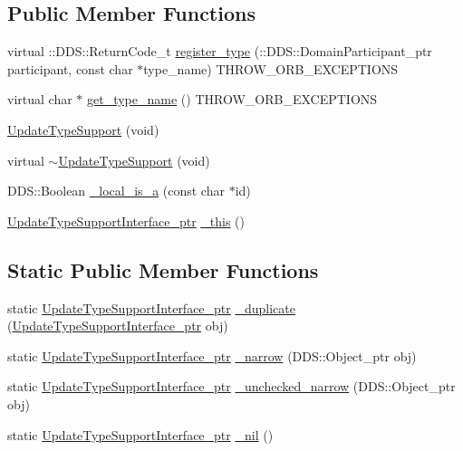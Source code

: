 \subsection*{Public Member Functions}
\begin{DoxyCompactItemize}
\item 
virtual ::DDS::ReturnCode\_\-t \hyperlink{classKnowledge_1_1UpdateTypeSupport_a1ebc851d4abdb5c52bb31a66ab1e73da}{register\_\-type} (::DDS::DomainParticipant\_\-ptr participant, const char $\ast$type\_\-name) THROW\_\-ORB\_\-EXCEPTIONS
\item 
virtual char $\ast$ \hyperlink{classKnowledge_1_1UpdateTypeSupport_a319f35c54cdd9aba6622c842b42b9ece}{get\_\-type\_\-name} () THROW\_\-ORB\_\-EXCEPTIONS
\item 
\hyperlink{classKnowledge_1_1UpdateTypeSupport_a18f5d8f5d5d9a4db5b78ad2449550f5e}{UpdateTypeSupport} (void)
\item 
virtual \hyperlink{classKnowledge_1_1UpdateTypeSupport_a2797f963a7aab3c29255166f3aca580f}{$\sim$UpdateTypeSupport} (void)
\item 
DDS::Boolean \hyperlink{classKnowledge_1_1UpdateTypeSupportInterface_a1c30da427241d245b73d9f6d494a741f}{\_\-local\_\-is\_\-a} (const char $\ast$id)
\item 
\hyperlink{classKnowledge_1_1UpdateTypeSupportInterface}{UpdateTypeSupportInterface\_\-ptr} \hyperlink{classKnowledge_1_1UpdateTypeSupportInterface_ac4f8121e712162f36c9b614d96c342fa}{\_\-this} ()
\end{DoxyCompactItemize}
\subsection*{Static Public Member Functions}
\begin{DoxyCompactItemize}
\item 
static \hyperlink{classKnowledge_1_1UpdateTypeSupportInterface}{UpdateTypeSupportInterface\_\-ptr} \hyperlink{classKnowledge_1_1UpdateTypeSupportInterface_a2b3c533d87e22886cc8230dbe184ffd7}{\_\-duplicate} (\hyperlink{classKnowledge_1_1UpdateTypeSupportInterface}{UpdateTypeSupportInterface\_\-ptr} obj)
\item 
static \hyperlink{classKnowledge_1_1UpdateTypeSupportInterface}{UpdateTypeSupportInterface\_\-ptr} \hyperlink{classKnowledge_1_1UpdateTypeSupportInterface_a1e632360831599f2dd690e815ee8764e}{\_\-narrow} (DDS::Object\_\-ptr obj)
\item 
static \hyperlink{classKnowledge_1_1UpdateTypeSupportInterface}{UpdateTypeSupportInterface\_\-ptr} \hyperlink{classKnowledge_1_1UpdateTypeSupportInterface_a04c376dcc7e26af2ee98d3d566e9de92}{\_\-unchecked\_\-narrow} (DDS::Object\_\-ptr obj)
\item 
static \hyperlink{classKnowledge_1_1UpdateTypeSupportInterface}{UpdateTypeSupportInterface\_\-ptr} \hyperlink{classKnowledge_1_1UpdateTypeSupportInterface_abcf482b666564230b905123a85faa2db}{\_\-nil} ()
\end{DoxyCompactItemize}
